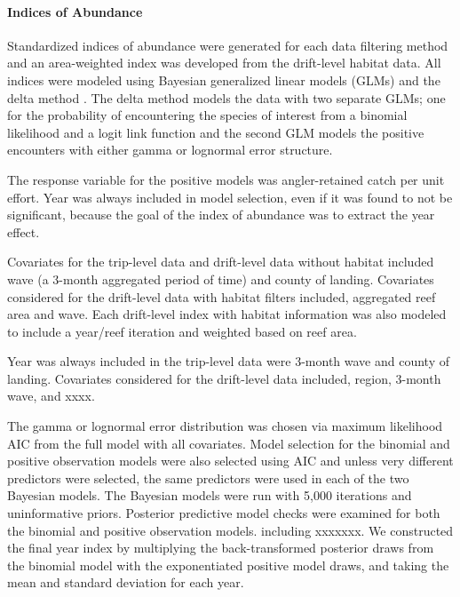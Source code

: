 \documentclass[
  authoryear,
  preprint,
  3p]{elsarticle}
\let\oldparagraph\paragraph
\renewcommand{\paragraph}[1]{\oldparagraph{#1}\mbox{}}
\begin{document}
\hypertarget{indices-of-abundance}{%
\paragraph{Indices of Abundance}\label{indices-of-abundance}}

Standardized indices of abundance were generated for each data filtering
method and an area-weighted index was developed from the drift-level
habitat data. All indices were modeled using Bayesian generalized linear
models (GLMs) and the delta method \citep{Lo:1992:IRA}. The delta method
models the data with two separate GLMs; one for the probability of
encountering the species of interest from a binomial likelihood and a
logit link function and the second GLM models the positive encounters
with either gamma or lognormal error structure.

The response variable for the positive models was angler-retained catch
per unit effort. Year was always included in model selection, even if it
was found to not be significant, because the goal of the index of
abundance was to extract the year effect.

Covariates for the trip-level data and drift-level data without habitat
included wave (a 3-month aggregated period of time) and county of
landing. Covariates considered for the drift-level data with habitat
filters included, aggregated reef area and wave. Each drift-level index
with habitat information was also modeled to include a year/reef
iteration and weighted based on reef area.

Year was always included in the trip-level data were 3-month wave and
county of landing. Covariates considered for the drift-level data
included, region, 3-month wave, and xxxx.

The gamma or lognormal error distribution was chosen via maximum
likelihood AIC from the full model with all covariates. Model selection
for the binomial and positive observation models were also selected
using AIC and unless very different predictors were selected, the same
predictors were used in each of the two Bayesian models. The Bayesian
models were run with 5,000 iterations and uninformative priors.
Posterior predictive model checks were examined for both the binomial
and positive observation models. including xxxxxxx. We constructed the
final year index by multiplying the back-transformed posterior draws
from the binomial model with the exponentiated positive model draws, and
taking the mean and standard deviation for each year.
\end{document}
